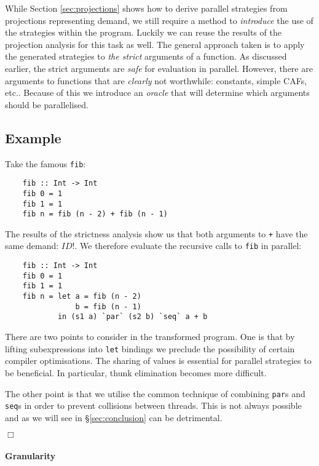 While Section \ref{sec:projections} shows how to derive parallel strategies
from projections representing demand, we still require a method to
\emph{introduce} the use of the strategies within the program.  Luckily we can
reuse the results of the projection analysis for this task as well.  The
general approach taken is to apply the generated strategies to \emph{the
strict} arguments of a function. As discussed earlier, the strict arguments are
\emph{safe} for evaluation in parallel. However, there are arguments to
functions that are \emph{clearly} not worthwhile: constants, simple CAFs, etc..
Because of this we introduce an \emph{oracle} that will determine which
arguments should be parallelised.

\subsection*{Example}

Take the famous \verb-fib-:

\begin{verbatim}
    fib :: Int -> Int
    fib 0 = 1
    fib 1 = 1
    fib n = fib (n - 2) + fib (n - 1)
\end{verbatim}

The results of the strictness analysis show us that both arguments to \verb-+-
have the same demand: $ID!$. We therefore evaluate the recursive calls to
\verb-fib- in parallel:

\begin{verbatim}
    fib :: Int -> Int
    fib 0 = 1
    fib 1 = 1
    fib n = let a = fib (n - 2)
                b = fib (n - 1)
            in (s1 a) `par` (s2 b) `seq` a + b
\end{verbatim}

There are two points to consider in the transformed program. One is that by
lifting subexpressions into \verb-let- bindings we preclude the possibility of
certain compiler optimisations. The sharing of values is essential for parallel
strategies to be beneficial.  In particular, thunk elimination becomes more
difficult.

The other point is that we utilise the common technique of combining
\verb-par-s and \verb-seq-s in order to prevent collisions between threads.
This is not always possible and as we will see in \S \ref{sec:conclusion} can
be detrimental.

\hfill$\Box$

\paragraph{Granularity}

